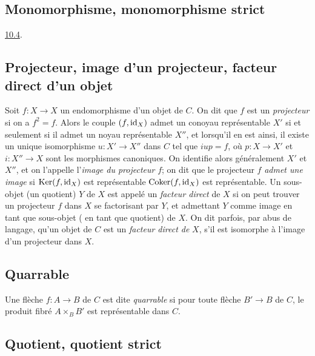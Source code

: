\documentclass[10pt]{../fichiers-configuration-latex/smfart}
\begin{document}
\subsection{Monomorphisme, monomorphisme
  strict}

\etc \Cf \hyperref[I.sec10.4]{10.4}.

\subsection{Projecteur, image d'un projecteur, facteur direct d'un
objet}

Soit $f:X\rightarrow X$ un endomorphisme d'un objet de $C$. On dit
que $f$ est un \emph{projecteur} si on a $f^2=f$. Alors le couple
$(f,\operatorname{id}_X)$ admet un conoyau représentable $X'$ si et seulement si
il admet un noyau représentable $X''$, et lorsqu'il en est ainsi, il
existe un unique isomorphisme $u:X'\rightarrow X''$ dans $C$ tel que
$iup=f$, où $p:X\rightarrow X'$ et $i:X''\rightarrow X$ sont les
morphismes canoniques.
On identifie alors généralement $X'$ et
$X''$, et on l'appelle l'\emph{image du projecteur} $f$; on dit que
le projecteur $f$ \emph{admet une image} si $\operatorname{Ker}(f,\operatorname{id}_X)$ est
représentable \ie $\operatorname{Coker}(f,\operatorname{id}_X)$ est représentable. Un sous-objet
(\resp un quotient) $Y$ de $X$ est appelé un \emph{facteur direct}
de $X$ si on peut trouver un projecteur $f$ dans $X$ se factorisant
par $Y$, et admettant $Y$ comme image en tant que sous-objet (\resp
en tant que quotient) de $X$. On dit parfois, par abus de langage,
qu'un objet de $C$ est un \emph{facteur direct de} $X$, s'il est
isomorphe à l'image d'un projecteur dans $X$.

\subsection{Quarrable}

Une flèche $f:A\rightarrow B$ de $C$ est dite \emph{quarrable} si
pour toute flèche $B'\rightarrow B$ de $C$, le produit fibré
$A\times_B B'$ est représentable dans $C$.

\subsection{Quotient, quotient strict}
\end{document}
